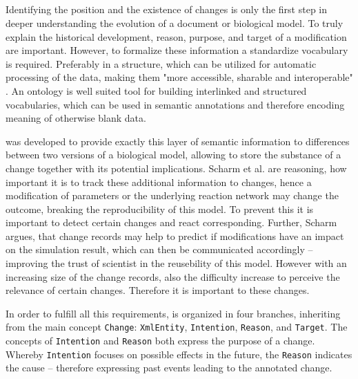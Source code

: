 	\subsection{\comodi}
	\label{sec:background:onto:comodi}
	Identifying the position and the existence of changes is only the first step in deeper understanding the evolution of a document or biological model. To truly explain the historical development, reason, purpose, and target of a modification are important. 
	However, to formalize these information a standardize vocabulary is required. Preferably in a structure, which can be utilized for automatic processing of the data, making them "more accessible, sharable and interoperable" \cite{Scharm2016}.
	An ontology is well suited tool for building interlinked and structured vocabularies, which can be used in semantic annotations and therefore encoding meaning of otherwise blank data.
	
	\comodi was developed to provide exactly this layer of semantic information to differences between two versions of a biological model, allowing to store the substance of a change together with its potential implications.
	Scharm et al. are reasoning, how important it is to track these additional information to changes, hence a modification of parameters or the underlying reaction network may change the outcome, breaking the reproducibility of this model. To prevent this it is important to detect certain changes and 
	react corresponding.
	Further, Scharm argues, that change records may help to predict if modifications have an impact on the simulation result, which can then be communicated accordingly -- improving the trust of scientist in the reusebility of this model.
	However with an increasing size of the change records, also the difficulty increase to perceive the relevance of certain changes. Therefore it is important to these changes.
	
	In order to fulfill all this requirements, \comodi is organized in four branches, inheriting from the main concept \texttt{Change}: \texttt{XmlEntity}, \texttt{Intention}, \texttt{Reason}, and \texttt{Target}.
	The concepts of \texttt{Intention} and \texttt{Reason} both express the purpose of a change. Whereby \texttt{Intention} focuses on possible effects in the future, the \texttt{Reason} indicates the cause -- therefore expressing past events leading to the annotated change.
	
	
	
